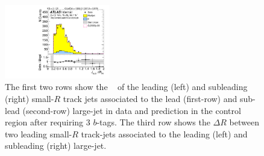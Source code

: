 \begin{figure}[htb!]
\begin{center}
\includegraphics[width=0.41\textwidth,angle=-90]{figures/boosted/Control/b77_ThreeTag_Control_sublHCand_trk_dr.pdf}
  \caption{The first two rows show the \pt~ of the leading (left) and subleading (right) small-$R$ track jets associated to the lead (first-row) and sub-lead (second-row) large-\R jet in data and prediction in the control region after requiring 3 $b$-tags. The third row shows the $\Delta R$ between two leading small-$R$ track-jets associated to the leading (left) and subleading (right) large-\R jet.  }
  \label{fig:boosted-3b-control-ak2}
\end{center}
\end{figure}


